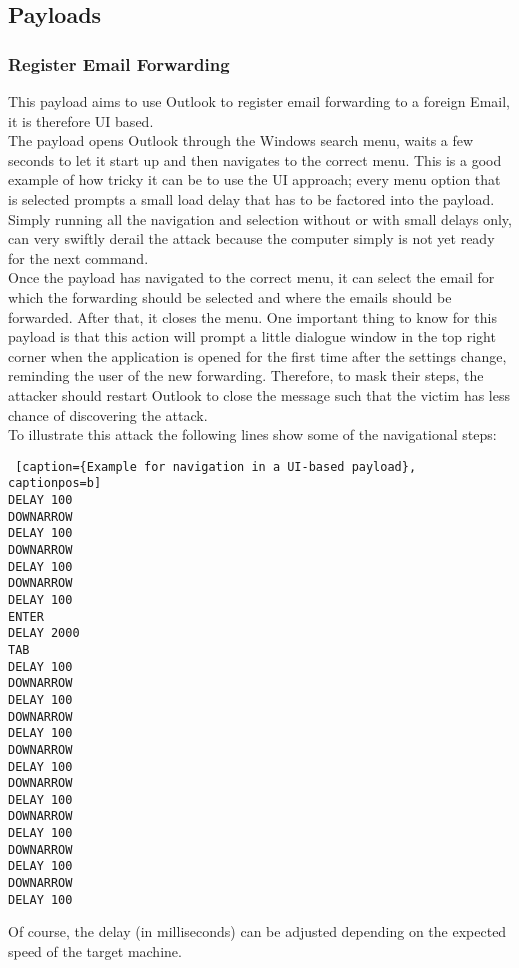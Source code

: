 \subsection{Payloads}

\subsubsection{Register Email Forwarding}

This payload aims to use Outlook to register email forwarding to a foreign Email, it is therefore UI based. \\
The payload opens Outlook through the Windows search menu, waits a few seconds to let it start up and then navigates to the correct menu. This is a good example of how tricky it can be to use the UI approach; every menu option that is selected prompts a small load delay that has to be factored into the payload. Simply running all the navigation and selection without or with small delays only, can very swiftly derail the attack because the computer simply is not yet ready for the next command. \\
Once the payload has navigated to the correct menu, it can select the email for which the forwarding should be selected and where the emails should be forwarded. After that, it closes the menu. One important thing to know for this payload is that this action will prompt a little dialogue window in the top right corner when the application is opened for the first time after the settings change, reminding the user of the new forwarding. Therefore, to mask their steps, the attacker should restart Outlook to close the message such that the victim has less chance of discovering the attack. \\
To illustrate this attack the following lines show some of the navigational steps:


\begin{lstlisting} [caption={Example for navigation in a UI-based payload}, captionpos=b]
DELAY 100
DOWNARROW
DELAY 100
DOWNARROW
DELAY 100
DOWNARROW
DELAY 100
ENTER
DELAY 2000
TAB
DELAY 100
DOWNARROW
DELAY 100
DOWNARROW
DELAY 100
DOWNARROW
DELAY 100
DOWNARROW
DELAY 100
DOWNARROW
DELAY 100
DOWNARROW
DELAY 100
DOWNARROW
DELAY 100
\end{lstlisting}

Of course, the delay (in milliseconds) can be adjusted depending on the expected speed of the target machine. 





